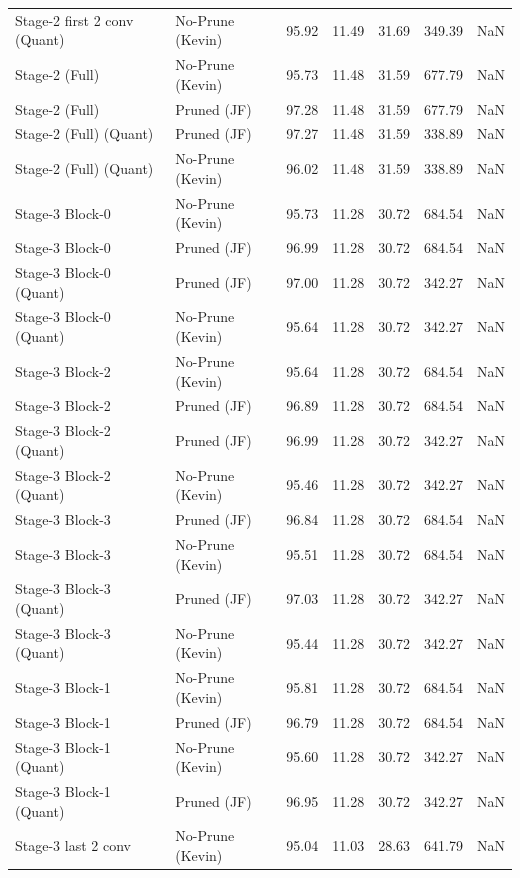 \begin{table}
\begin{tabular}{llrrrrl}
Stage-2 first 2 conv
(Quant) & No-Prune (Kevin) & 95.92 & 11.49 & 31.69 & 349.39 & NaN \\
Stage-2 (Full) & No-Prune (Kevin) & 95.73 & 11.48 & 31.59 & 677.79 & NaN \\
Stage-2 (Full) & Pruned (JF) & 97.28 & 11.48 & 31.59 & 677.79 & NaN \\
Stage-2 (Full)
(Quant) & Pruned (JF) & 97.27 & 11.48 & 31.59 & 338.89 & NaN \\
Stage-2 (Full)
(Quant) & No-Prune (Kevin) & 96.02 & 11.48 & 31.59 & 338.89 & NaN \\
Stage-3 Block-0 & No-Prune (Kevin) & 95.73 & 11.28 & 30.72 & 684.54 & NaN \\
Stage-3 Block-0 & Pruned (JF) & 96.99 & 11.28 & 30.72 & 684.54 & NaN \\
Stage-3 Block-0
(Quant) & Pruned (JF) & 97.00 & 11.28 & 30.72 & 342.27 & NaN \\
Stage-3 Block-0
(Quant) & No-Prune (Kevin) & 95.64 & 11.28 & 30.72 & 342.27 & NaN \\
Stage-3 Block-2 & No-Prune (Kevin) & 95.64 & 11.28 & 30.72 & 684.54 & NaN \\
Stage-3 Block-2 & Pruned (JF) & 96.89 & 11.28 & 30.72 & 684.54 & NaN \\
Stage-3 Block-2
(Quant) & Pruned (JF) & 96.99 & 11.28 & 30.72 & 342.27 & NaN \\
Stage-3 Block-2
(Quant) & No-Prune (Kevin) & 95.46 & 11.28 & 30.72 & 342.27 & NaN \\
Stage-3 Block-3 & Pruned (JF) & 96.84 & 11.28 & 30.72 & 684.54 & NaN \\
Stage-3 Block-3 & No-Prune (Kevin) & 95.51 & 11.28 & 30.72 & 684.54 & NaN \\
Stage-3 Block-3
(Quant) & Pruned (JF) & 97.03 & 11.28 & 30.72 & 342.27 & NaN \\
Stage-3 Block-3
(Quant) & No-Prune (Kevin) & 95.44 & 11.28 & 30.72 & 342.27 & NaN \\
Stage-3 Block-1 & No-Prune (Kevin) & 95.81 & 11.28 & 30.72 & 684.54 & NaN \\
Stage-3 Block-1 & Pruned (JF) & 96.79 & 11.28 & 30.72 & 684.54 & NaN \\
Stage-3 Block-1
(Quant) & No-Prune (Kevin) & 95.60 & 11.28 & 30.72 & 342.27 & NaN \\
Stage-3 Block-1
(Quant) & Pruned (JF) & 96.95 & 11.28 & 30.72 & 342.27 & NaN \\
Stage-3 last 2 conv & No-Prune (Kevin) & 95.04 & 11.03 & 28.63 & 641.79 & NaN \\

\end{tabular}
\end{table}
